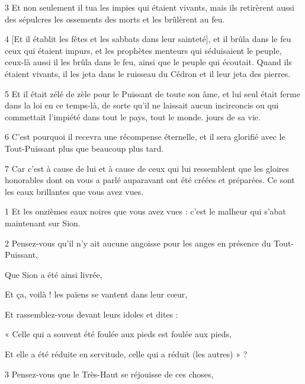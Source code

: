 \par 3 Et non seulement il tua les impies qui étaient vivants, mais ils retirèrent aussi des sépulcres les ossements des morts et les brûlèrent au feu.

\par 4 [Et il établit les fêtes et les sabbats dans leur sainteté], et il brûla dans le feu ceux qui étaient impurs, et les prophètes menteurs qui séduisaient le peuple, ceux-là aussi il les brûla dans le feu, ainsi que le peuple qui écoutait. Quand ils étaient vivants, il les jeta dans le ruisseau du Cédron et il leur jeta des pierres.

\par 5 Et il était zélé de zèle pour le Puissant de toute son âme, et lui seul était ferme dans la loi en ce temps-là, de sorte qu'il ne laissait aucun incirconcis ou qui commettait l'impiété dans tout le pays, tout le monde. jours de sa vie.

\par 6 C'est pourquoi il recevra une récompense éternelle, et il sera glorifié avec le Tout-Puissant plus que beaucoup plus tard.

\par 7 Car c'est à cause de lui et à cause de ceux qui lui ressemblent que les gloires honorables dont on vous a parlé auparavant ont été créées et préparées. Ce sont les eaux brillantes que vous avez vues.


\par 1 Et les onzièmes eaux noires que vous avez vues : c'est le malheur qui s'abat maintenant sur Sion.

\par 2 Pensez-vous qu'il n'y ait aucune angoisse pour les anges en présence du Tout-Puissant,

\par Que Sion a été ainsi livrée,

\par Et ça, voilà ! les païens se vantent dans leur cœur,

\par Et rassemblez-vous devant leurs idoles et dites :

\par « Celle qui a souvent été foulée aux pieds est foulée aux pieds,

\par Et elle a été réduite en servitude, celle qui a réduit (les autres) » ?

\par 3 Pensez-vous que le Très-Haut se réjouisse de ces choses,

